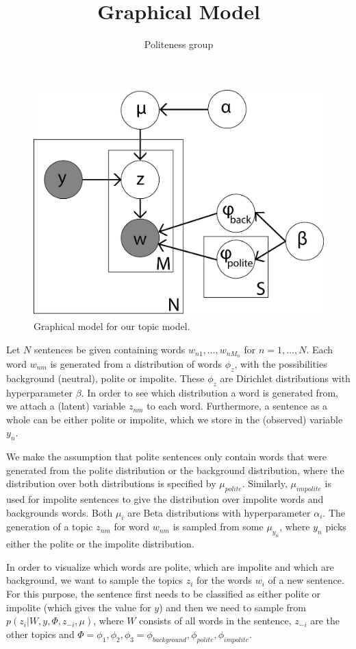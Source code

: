 \documentclass[11pt, english]{article}
\title{Graphical Model}
\author{Politeness group}
\begin{document}
\maketitle
\begin{figure}
    \centering
    \includegraphics[scale=0.5]{Model}
    \caption{Graphical model for our topic model.}
\end{figure}
Let $N$ sentences be given containing words $w_{n1},\dots,w_{nM_n}$ for $n=1,\dots,N$. Each word $w_{nm}$ is generated from a distribution of words $\phi_z$, with the possibilities background (neutral), polite or impolite. These $\phi_z$ are Dirichlet distributions with hyperparameter $\beta$. In order to see which distribution a word is generated from, we attach a (latent) variable $z_{nm}$ to each word. Furthermore, a sentence as a whole can be either polite or impolite, which we store in the (observed) variable $y_n$. 

We make the assumption that polite sentences only contain words that were generated from the polite distribution or the background distribution, where the distribution over both distributions is specified by $\mu_{polite}$. Similarly, $\mu_{impolite}$ is used for impolite sentences to give the distribution over impolite words and backgrounds words. Both $\mu_i$ are Beta distributions with hyperparameter $\alpha_i$. The generation of a topic $z_{nm}$ for word $w_{nm}$ is sampled from some $\mu_{y_n}$, where $y_n$ picks either the polite or the impolite distribution.

In order to visualize which words are polite, which are impolite and which are background, we want to sample the topics $z_i$ for the words $w_i$ of a new sentence. For this purpose, the sentence first needs to be classified as either polite or impolite (which gives the value for $y$) and then we need to sample from $p(z_{i}|W,y,\Phi,z_{-i},\mu)$, where $W$ consists of all words in the sentence, $z_{-i}$ are the other topics and $\Phi = \phi_1,\phi_2,\phi_3=\phi_{background},\phi_{polite},\phi_{impolite}$. 
\end{document}
